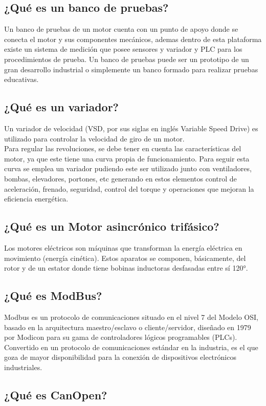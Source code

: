 \subsection{¿Qué es un banco de pruebas?}

Un banco de pruebas de un motor cuenta con un punto de apoyo donde se conecta el motor y sus componentes mecánicos, ademas dentro de esta plataforma existe un sistema de medición que posee sensores y variador y PLC para los procedimientos de prueba.
Un banco de pruebas puede ser un prototipo de un gran desarrollo industrial o simplemente un banco formado para realizar pruebas educativas. 


\subsection{¿Qué es un variador?}
Un variador de velocidad (VSD, por sus siglas en inglés Variable Speed Drive) es utilizado para controlar la velocidad de giro de un motor. \\
Para regular las revoluciones, se debe tener en cuenta las características del motor, ya que este tiene una curva propia de funcionamiento. Para seguir esta curva se emplea un variador pudiendo este ser utilizado junto con ventiladores, bombas, elevadores, portones, etc generando en estos elementos control de aceleración, frenado, seguridad, control del torque y operaciones que mejoran la eficiencia energética.

\subsection{¿Qué es un Motor asincrónico trifásico?}
Los motores eléctricos son máquinas que transforman la energía eléctrica en
movimiento (energía cinética). Estos aparatos se componen, básicamente, del rotor y de un estator donde tiene bobinas inductoras desfasadas entre sí 120°.

\subsection{¿Qué es ModBus?}
Modbus es un protocolo de comunicaciones situado en el nivel 7 del Modelo OSI, basado en la arquitectura maestro/esclavo o cliente/servidor, diseñado en 1979 por Modicon para su gama de controladores lógicos programables (PLCs). Convertido en un protocolo de comunicaciones estándar en la industria, es el que goza de mayor disponibilidad para la conexión de dispositivos electrónicos industriales.

\subsection{¿Qué es CanOpen?}